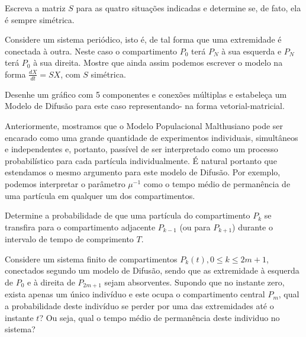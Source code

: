  

\begin{exercise}
Escreva a matriz \(S\) para as quatro situações indicadas e determine se, de fato, ela é sempre simétrica. 
\end{exercise}

\begin{exercise}
Considere um sistema periódico, isto é, de tal forma que uma extremidade é conectada à outra. Neste caso o compartimento \(P_0\) terá \(P_N\) à sua esquerda e \(P_N\) terá \(P_0\) à sua direita. Mostre que ainda assim podemos escrever o modelo na forma \(\frac{dX}{dt} = SX\), com \(S\) simétrica.
\end{exercise}




\begin{exercise}
Desenhe um gráfico com 5 componentes e conexões múltiplas e estabeleça um Modelo de Difusão para este caso representando- na forma vetorial-matricial.
\end{exercise}

Anteriormente, mostramos que o Modelo Populacional Malthusiano pode ser encarado como uma grande quantidade de experimentos individuais, simultâneos e independentes e, portanto, passível de ser interpretado como um processo probabilístico para cada partícula individualmente. É natural portanto que estendamos o mesmo argumento para este modelo de Difusão. Por exemplo, podemos interpretar o parâmetro \(\mu^{-1}\) como o tempo médio de permanência de uma partícula em qualquer um dos compartimentos.


\begin{exercise}
Determine a probabilidade de que uma partícula do compartimento \(P_k\) se transfira para o compartimento adjacente \(P_{k-1}\) (ou para \(P_{k+1}\)) durante o intervalo de tempo de comprimento \(T\).
\end{exercise}

\begin{exercise}
Considere um sistema finito de compartimentos \(P_k(t), 0 \le k \le 2m+1\), conectados segundo um modelo de Difusão, sendo que as extremidade à esquerda de \(P_0\) e à direita de \(P_{2m+1}\) sejam absorventes. Supondo que no instante zero, exista apenas um único indivíduo e este ocupa o compartimento central \(P_m\), qual a probabilidade deste indivíduo se perder por uma das extremidades até o instante \(t\)? Ou seja, qual o tempo médio de permanência deste individuo no sistema?
\end{exercise}




